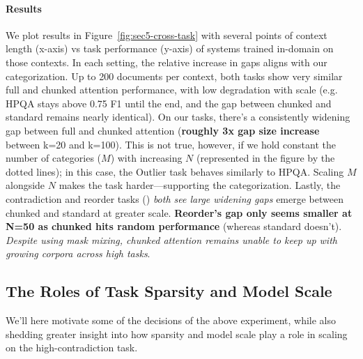 \paragraph{Results}  We plot results in Figure~\ref{fig:sec5-cross-task} with several points of context length (x-axis) vs task performance (y-axis) of systems trained in-domain on those contexts. In each setting, the relative increase in gaps aligns with our \cname categorization. Up to 200 documents per context, both  tasks show very similar full and chunked attention performance, with low degradation with scale (e.g. HPQA stays above 0.75 F1 until the end, and the gap between chunked and standard remains nearly identical). On our  tasks, there's a consistently widening gap between full and chunked attention (\textbf{roughly 3x gap size increase} between k=20 and k=100). This is not true, however, if we hold constant the number of categories ($M$) with increasing $N$ (represented in the figure by the dotted lines); in this case, the Outlier task behaves similarly to HPQA. Scaling $M$ alongside $N$ makes the task harder---supporting the  categorization. Lastly, the contradiction and reorder tasks () \emph{both see large widening gaps} emerge between chunked and standard at greater scale. \textbf{Reorder's gap only seems smaller at N=50 as chunked hits random performance} (whereas standard doesn't).  \emph{Despite using mask mixing, chunked attention remains unable to keep up with growing corpora across high \boldmath \cname tasks}.



\subsection{The Roles of Task Sparsity and Model Scale}

\label{sec:sparsityscaleresults}

We'll here motivate some of the decisions of the above experiment, while also shedding greater insight into how sparsity and model scale play a role in scaling on the high-\cname contradiction task.



